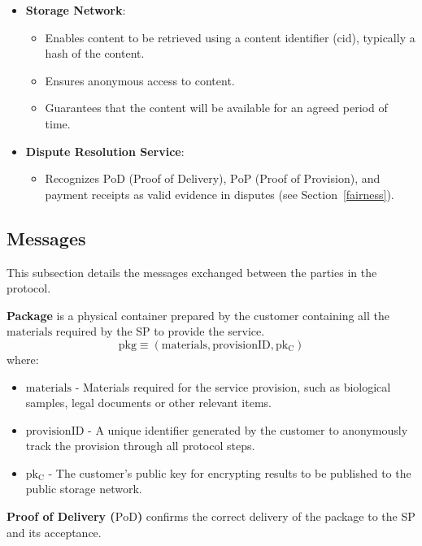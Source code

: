 \documentclass[pdftex,twocolumn,epjc3]{svjour3}
\begin{document}
\begin{itemize}
\item \textbf{Storage Network}:
  \begin{itemize}
      \item Enables content to be retrieved using a content identifier ($\mathrm{cid}$), typically a hash of the content.
      \item Ensures anonymous access to content.
      \item Guarantees that the content will be available for an agreed period of time.
  \end{itemize}
  
    
\item \textbf{Dispute Resolution Service}:
    \begin{itemize}
        \item Recognizes $\mathrm{PoD}$ (Proof of Delivery), $\mathrm{PoP}$ (Proof of Provision), and payment receipts as valid evidence in disputes (see Section~\ref{fairness}).
    \end{itemize}
\end{itemize}

\subsection{Messages}\label{messages}
This subsection details the messages exchanged between the parties in the protocol.

\vspace{5mm}

\noindent \textbf{Package}\label{package} is a physical container prepared by the customer containing all the $\mathrm{materials}$ required by the SP to provide the service.
\[\mathrm{pkg} \equiv (\mathrm{materials}, \mathrm{provisionID}, \mathrm{pk_C})\]
where:
\begin{itemize}
\item $\mathrm{materials}$ - Materials required for the service provision, such as biological samples, legal documents or other relevant items.
\item $\mathrm{provisionID}$ - A unique identifier generated by the customer to anonymously track the provision through all protocol steps.
\item $\mathrm{pk_C}$ - The customer's public key for encrypting results to be published to the public storage network.
\end{itemize}

\noindent \textbf{Proof of Delivery ($\mathrm{PoD}$)}\label{proof-of-delivery} confirms the correct delivery of the package to the SP and its acceptance.
\end{document}
